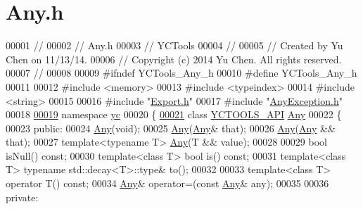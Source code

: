 \hypertarget{_any_8h_source}{}\section{Any.\+h}
\label{_any_8h_source}

\begin{DoxyCode}
00001 \textcolor{comment}{//}
00002 \textcolor{comment}{//  Any.h}
00003 \textcolor{comment}{//  YCTools}
00004 \textcolor{comment}{//}
00005 \textcolor{comment}{//  Created by Yu Chen on 11/13/14.}
00006 \textcolor{comment}{//  Copyright (c) 2014 Yu Chen. All rights reserved.}
00007 \textcolor{comment}{//}
00008 
00009 \textcolor{preprocessor}{#ifndef YCTools\_Any\_h}
00010 \textcolor{preprocessor}{#define YCTools\_Any\_h}
00011 
00012 \textcolor{preprocessor}{#include <memory>}
00013 \textcolor{preprocessor}{#include <typeindex>}
00014 \textcolor{preprocessor}{#include <string>}
00015 
00016 \textcolor{preprocessor}{#include "\hyperlink{yctools_2_export_8h}{Export.h}"}
00017 \textcolor{preprocessor}{#include "\hyperlink{_any_exception_8h}{AnyException.h}"}
00018 
\hypertarget{_any_8h_source_l00019}{}\hyperlink{namespaceyc}{00019} \textcolor{keyword}{namespace }\hyperlink{namespaceyc}{yc}
00020 \{
\hypertarget{_any_8h_source_l00021}{}\hyperlink{classyc_1_1_any}{00021}     \textcolor{keyword}{class }\hyperlink{yctools_2_export_8h_aa9bd63af2d697c3f5d9ee84516c21762}{YCTOOLS\_API} \hyperlink{classyc_1_1_any}{Any}
00022     \{
00023     \textcolor{keyword}{public}:
00024         \hyperlink{classyc_1_1_any}{Any}(\textcolor{keywordtype}{void});
00025         \hyperlink{classyc_1_1_any}{Any}(\hyperlink{classyc_1_1_any}{Any}& that);
00026         \hyperlink{classyc_1_1_any}{Any}(\hyperlink{classyc_1_1_any}{Any} && that);
00027         \textcolor{keyword}{template}<\textcolor{keyword}{typename} T> \hyperlink{classyc_1_1_any}{Any}(T && value);
00028         
00029         \textcolor{keywordtype}{bool} isNull() \textcolor{keyword}{const};
00030         \textcolor{keyword}{template}<\textcolor{keyword}{class} T> \textcolor{keywordtype}{bool} is() \textcolor{keyword}{const};
00031         \textcolor{keyword}{template}<\textcolor{keyword}{class} T> \textcolor{keyword}{typename} std::decay<T>::type& to();
00032         
00033         \textcolor{keyword}{template}<\textcolor{keyword}{class} T> \textcolor{keyword}{operator} T() \textcolor{keyword}{const};
00034         \hyperlink{classyc_1_1_any}{Any}& operator=(\textcolor{keyword}{const} \hyperlink{classyc_1_1_any}{Any}& any);
00035         
00036     \textcolor{keyword}{private}:

\end{DoxyCode}

